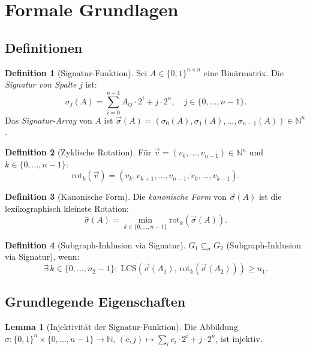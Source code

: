 ﻿\documentclass[a4paper,12pt]{article}
\theoremstyle{definition}
\newtheorem{definition}{Definition}
\newtheorem{lemma}{Lemma}
\begin{document}
\section{Formale Grundlagen}

\subsection{Definitionen}

\begin{definition}[Signatur-Funktion]
\label{def:sigma}
Sei $A \in \{0,1\}^{n \times n}$ eine Bin\"armatrix.
Die \emph{Signatur von Spalte $j$} ist:
\[
\sigma_j(A) = \sum_{i=0}^{n-1} A_{ij} \cdot 2^i + j \cdot 2^n,
\quad j \in \{0, \ldots, n-1\}.
\]
Das \emph{Signatur-Array} von $A$ ist
$\vec{\sigma}(A) = (\sigma_0(A), \sigma_1(A), \ldots, \sigma_{n-1}(A))
\in \mathbb{N}^n$.
\end{definition}

\begin{definition}[Zyklische Rotation]
F\"ur $\vec{v} = (v_0, \ldots, v_{n-1}) \in \mathbb{N}^n$ und $k \in \{0,\ldots,n-1\}$:
\[
\mathrm{rot}_k(\vec{v}) = (v_k, v_{k+1}, \ldots, v_{n-1}, v_0, \ldots, v_{k-1}).
\]
\end{definition}

\begin{definition}[Kanonische Form]
Die \emph{kanonische Form} von $\vec{\sigma}(A)$ ist die lexikographisch
kleinste Rotation:
\[
\hat{\sigma}(A) = \min_{k \in \{0,\ldots,n-1\}} \mathrm{rot}_k(\vec{\sigma}(A)).
\]
\end{definition}

\begin{definition}[Subgraph-Inklusion via Signatur]
$G_1 \subseteq_\sigma G_2$ (Subgraph-Inklusion via Signatur), wenn:
\[
\exists\, k \in \{0,\ldots,n_2-1\}:\;
\mathrm{LCS}\!\left(\vec{\sigma}(A_1),\,
\mathrm{rot}_k(\vec{\sigma}(A_2))\right) \geq n_1.
\]
\end{definition}

\subsection{Grundlegende Eigenschaften}

\begin{lemma}[Injektivit\"at der Signatur-Funktion]
\label{lem:inj}
Die Abbildung $\sigma: \{0,1\}^n \times \{0,\ldots,n-1\} \to \mathbb{N}$,
$(c, j) \mapsto \sum_i c_i \cdot 2^i + j \cdot 2^n$, ist injektiv.
\end{lemma}
\end{document}

